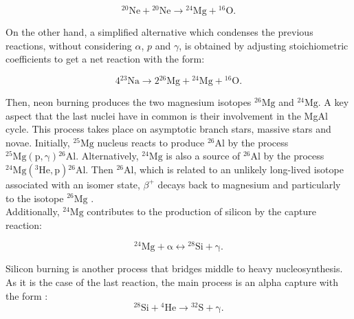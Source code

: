 \documentclass[openany]{book}
\begin{document}
\begin{equation}\label{eq:reaction_neon_net}
	\mathrm{{}^{20}Ne + {}^{20}Ne \rightarrow {}^{24}Mg + {}^{16}O}.
\end{equation}

On the other hand, a simplified alternative which condenses the previous reactions, without considering $\alpha$, $p$ and $\gamma$, is obtained by adjusting stoichiometric coefficients to get a net reaction with the form: 

\begin{equation}\label{eq:reaction_sodium_net}
	\mathrm{4{}^{23}Na \rightarrow 2 {}^{26}Mg + {}^{24}Mg + {}^{16}O}.
\end{equation}

Then, neon burning produces the two magnesium isotopes $\mathrm{{}^{26}Mg}$ and $\mathrm{{}^{24}Mg}$. A key aspect that the last nuclei have in common is their involvement in the MgAl cycle. This process takes place on asymptotic branch stars, massive stars and novae. Initially, $\mathrm{{}^{25}Mg}$ nucleus reacts to produce $\mathrm{{}^{26}Al}$ by the process $\mathrm{{}^{25}Mg(p, \gamma){}^{26}Al}$. Alternatively, $\mathrm{{}^{24}Mg}$ is also a source of $\mathrm{{}^{26}Al}$ by the process $\mathrm{{}^{24}Mg({}^{3}He, p){}^{26}{Al}}$. Then $\mathrm{{}^{26}Al}$, which is related to an unlikely long-lived isotope associated with an isomer state,  $\beta^{+}$ decays back to magnesium and particularly to the isotope $\mathrm{{}^{26}Mg}$ \cite{lotay_doherty_janssens_seweryniak_albers_almaraz-calderon_carpenter_champagne_chiara_hoffman_et_2022}. \\

Additionally, $ \mathrm{{}^{24}Mg}$ contributes to the production of silicon by the capture reaction: 

\begin{equation}\label{eq:reaction_magnesium_alphaCapture}
		\mathrm{{}^{24}Mg + \alpha \leftrightarrow {}^{28}Si + \gamma}.
\end{equation}

Silicon burning is another process that bridges middle to heavy nucleosynthesis. As it is the case of the last reaction, the main process is an alpha capture with the form \cite{bodansky_clayton_fowler_1968}:   \\

\begin{equation} \label{eq:reaction_28Sialpha}
	\mathrm{{}^{28}Si +{}^{4}He \rightarrow {}^{32}S + \gamma}.
\end{equation}
\end{document}
